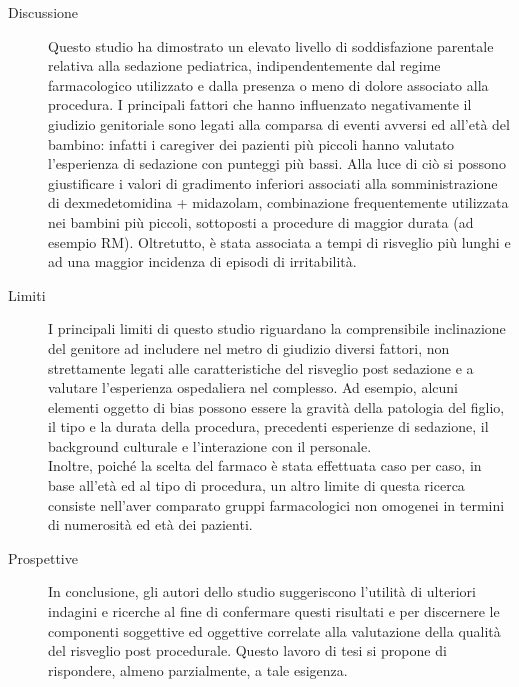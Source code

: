 \begin{description}
\item[Discussione] 
Questo studio ha dimostrato un elevato livello di soddisfazione parentale relativa alla sedazione pediatrica, indipendentemente dal regime farmacologico utilizzato e dalla presenza o meno di dolore associato alla procedura. I principali fattori che hanno influenzato negativamente il giudizio genitoriale sono legati alla comparsa di eventi avversi ed all'età del bambino: infatti i caregiver dei pazienti più piccoli hanno valutato l'esperienza di sedazione con punteggi più bassi.
Alla luce di ciò si possono giustificare i valori di gradimento inferiori associati alla somministrazione di dexmedetomidina + midazolam, combinazione frequentemente utilizzata nei bambini più piccoli, sottoposti a procedure di maggior durata (ad esempio RM). Oltretutto, è stata associata a tempi di risveglio più lunghi e ad una maggior incidenza di episodi di irritabilità. 

\item[Limiti]
I principali limiti di questo studio riguardano la comprensibile inclinazione del genitore ad includere nel metro di giudizio diversi fattori, non strettamente legati alle caratteristiche del risveglio post sedazione e a valutare l'esperienza ospedaliera nel complesso. Ad esempio, alcuni elementi oggetto di bias possono essere la gravità della patologia del figlio, il tipo e la durata della procedura, precedenti esperienze di sedazione, il background culturale e l'interazione con il personale. 
\\Inoltre, poiché la scelta del farmaco è stata effettuata caso per caso, in base all'età ed al tipo di procedura, un altro limite di questa ricerca consiste nell'aver comparato gruppi farmacologici non omogenei in termini di numerosità ed età dei pazienti.
\item[Prospettive] 

In conclusione, gli autori dello studio suggeriscono l'utilità di ulteriori indagini e ricerche al fine di confermare questi risultati e per discernere le componenti soggettive ed oggettive correlate alla valutazione della qualità del risveglio post procedurale. Questo lavoro di tesi si propone di rispondere, almeno parzialmente, a tale esigenza.


\end{description}







